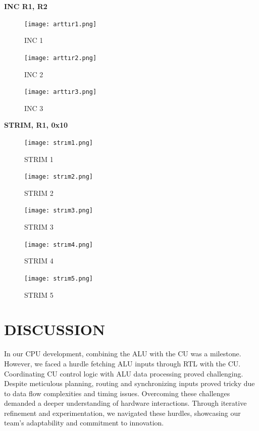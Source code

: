 \documentclass[pdftex,12pt,a4paper]{article}
\begin{document}
	
	\textbf{INC R1, R2}\par
	\begin{figure}[H]
		\centering
		\texttt{[image: arttır1.png]}
		\caption{INC 1}
		\label{fig:Operation Codes}
	\end{figure}\par 
	\begin{figure}[H]
		\centering
		\texttt{[image: arttır2.png]}
		\caption{INC 2}
		\label{fig:Operation Codes}
	\end{figure}\par 
	\begin{figure}[H]
		\centering
		\texttt{[image: arttır3.png]}
		\caption{INC 3}
		\label{fig:Operation Codes}
	\end{figure}\newpage
	\textbf{STRIM, R1, 0x10}\par
	\begin{figure}[H]
		\centering
		\texttt{[image: strım1.png]}
		\caption{STRIM 1}
		\label{fig:Operation Codes}
	\end{figure}\par 
	\begin{figure}[H]
		\centering
		\texttt{[image: strım2.png]}
		\caption{STRIM 2}
		\label{fig:Operation Codes}
	\end{figure}\par 
	\begin{figure}[H]
		\centering
		\texttt{[image: strım3.png]}
		\caption{STRIM 3}
		\label{fig:Operation Codes}
	\end{figure}\par 
	\begin{figure}[H]
		\centering
		\texttt{[image: strım4.png]}
		\caption{STRIM 4}
		\label{fig:Operation Codes}
	\end{figure}\par 
	\begin{figure}[H]
		\centering
		\texttt{[image: strım5.png]}
		\caption{STRIM 5}
		\label{fig:Operation Codes}
	\end{figure}\par 
	
	\section{DISCUSSION}
	In our CPU development, combining the ALU with the CU was a milestone. However, we faced a hurdle fetching ALU inputs through RTL with the CU. Coordinating CU control logic with ALU data processing proved challenging. Despite meticulous planning, routing and synchronizing inputs proved tricky due to data flow complexities and timing issues. Overcoming these challenges demanded a deeper understanding of hardware interactions. Through iterative refinement and experimentation, we navigated these hurdles, showcasing our team's adaptability and commitment to innovation.
	
\end{document}
